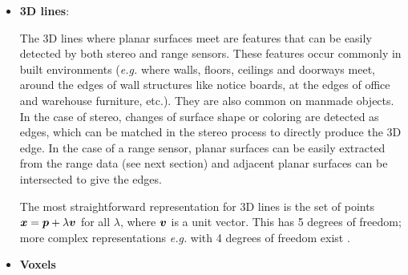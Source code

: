 \documentclass[twocolumn,oneside]{book}
\newcommand{\V}[1]{\vector{#1}}  %
\begin{document}
\begin{itemize}
\item {\bf 3D lines}:
  
  The 3D lines where planar surfaces meet are features that can be
  easily detected by both stereo and range sensors.  These features
  occur commonly in built environments ({\it e.g.} where walls,
  floors, ceilings and doorways meet, around the edges of wall
  structures like notice boards, at the edges of office and warehouse
  furniture, etc.).  They are also common on manmade objects.  In the
  case of stereo, changes of surface shape or coloring are detected as
  edges, which can be matched in the stereo process to directly
  produce the 3D edge.  In the case of a range sensor, planar surfaces
  can be easily extracted from the range data (see next section) and
  adjacent planar surfaces can be intersected to give the edges.

  The most straightforward representation for 3D lines is the set of
  points $\V x = \V p + \lambda \V v$ for all $\lambda$, where $\V v$
  is a unit vector.  This has 5 degrees of freedom; more complex
  representations {\it e.g.} with 4 degrees of freedom exist
  \cite{hartley}.

\item {\bf Voxels}


\end{itemize}
\end{document}
